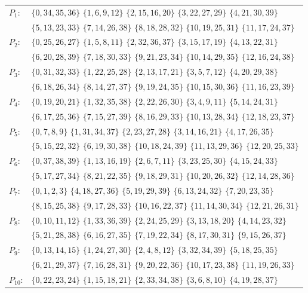 \documentclass[11pt]{article}
\theoremstyle{definition}
\theoremstyle{remark}
\begin{document}
\begin{center}\small
\begin{tabular}{@{}ll@{}}
$P_{1}$: & $\{0,34,35,36\}$ $\{1,6,9,12\}$ $\{2,15,16,20\}$ $\{3,22,27,29\}$ $\{4,21,30,39\}$\\
& $\{5,13,23,33\}$ $\{7,14,26,38\}$ $\{8,18,28,32\}$ $\{10,19,25,31\}$ $\{11,17,24,37\}$\\[2pt]
$P_{2}$: & $\{0,25,26,27\}$ $\{1,5,8,11\}$ $\{2,32,36,37\}$ $\{3,15,17,19\}$ $\{4,13,22,31\}$\\
& $\{6,20,28,39\}$ $\{7,18,30,33\}$ $\{9,21,23,34\}$ $\{10,14,29,35\}$ $\{12,16,24,38\}$\\[2pt]
$P_{3}$: & $\{0,31,32,33\}$ $\{1,22,25,28\}$ $\{2,13,17,21\}$ $\{3,5,7,12\}$ $\{4,20,29,38\}$\\
& $\{6,18,26,34\}$ $\{8,14,27,37\}$ $\{9,19,24,35\}$ $\{10,15,30,36\}$ $\{11,16,23,39\}$\\[2pt]
$P_{4}$: & $\{0,19,20,21\}$ $\{1,32,35,38\}$ $\{2,22,26,30\}$ $\{3,4,9,11\}$ $\{5,14,24,31\}$\\
& $\{6,17,25,36\}$ $\{7,15,27,39\}$ $\{8,16,29,33\}$ $\{10,13,28,34\}$ $\{12,18,23,37\}$\\[2pt]
$P_{5}$: & $\{0,7,8,9\}$ $\{1,31,34,37\}$ $\{2,23,27,28\}$ $\{3,14,16,21\}$ $\{4,17,26,35\}$\\
& $\{5,15,22,32\}$ $\{6,19,30,38\}$ $\{10,18,24,39\}$ $\{11,13,29,36\}$ $\{12,20,25,33\}$\\[2pt]
$P_{6}$: & $\{0,37,38,39\}$ $\{1,13,16,19\}$ $\{2,6,7,11\}$ $\{3,23,25,30\}$ $\{4,15,24,33\}$\\
& $\{5,17,27,34\}$ $\{8,21,22,35\}$ $\{9,18,29,31\}$ $\{10,20,26,32\}$ $\{12,14,28,36\}$\\[2pt]
$P_{7}$: & $\{0,1,2,3\}$ $\{4,18,27,36\}$ $\{5,19,29,39\}$ $\{6,13,24,32\}$ $\{7,20,23,35\}$\\
& $\{8,15,25,38\}$ $\{9,17,28,33\}$ $\{10,16,22,37\}$ $\{11,14,30,34\}$ $\{12,21,26,31\}$\\[2pt]
$P_{8}$: & $\{0,10,11,12\}$ $\{1,33,36,39\}$ $\{2,24,25,29\}$ $\{3,13,18,20\}$ $\{4,14,23,32\}$\\
& $\{5,21,28,38\}$ $\{6,16,27,35\}$ $\{7,19,22,34\}$ $\{8,17,30,31\}$ $\{9,15,26,37\}$\\[2pt]
$P_{9}$: & $\{0,13,14,15\}$ $\{1,24,27,30\}$ $\{2,4,8,12\}$ $\{3,32,34,39\}$ $\{5,18,25,35\}$\\
& $\{6,21,29,37\}$ $\{7,16,28,31\}$ $\{9,20,22,36\}$ $\{10,17,23,38\}$ $\{11,19,26,33\}$\\[2pt]
$P_{10}$: & $\{0,22,23,24\}$ $\{1,15,18,21\}$ $\{2,33,34,38\}$ $\{3,6,8,10\}$ $\{4,19,28,37\}$\\

\end{tabular}
\end{center}
\end{document}
